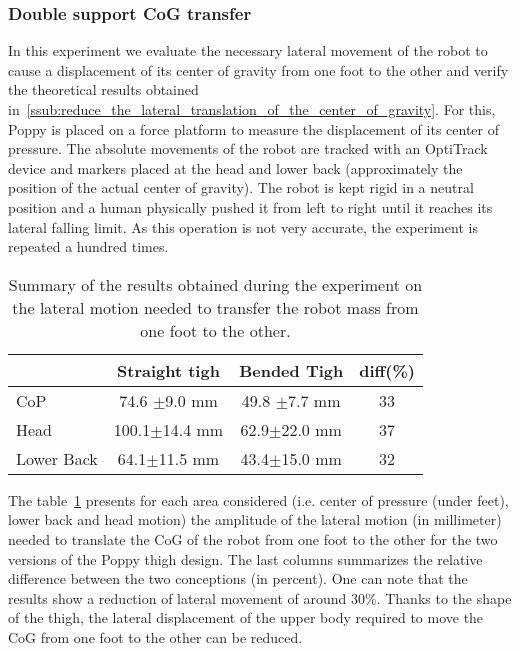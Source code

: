 

\subsubsection{Double support CoG transfer} %
\label{sub:cog_motion}


In this experiment we evaluate the necessary lateral movement of the robot to cause a displacement
of its center of gravity from one foot to the other and verify the theoretical results obtained
in~\ref{ssub:reduce_the_lateral_translation_of_the_center_of_gravity}. For this, Poppy is placed on
a force platform to measure the displacement of its center of pressure. The absolute movements of
the robot are tracked with an OptiTrack device and markers placed at the head and lower back
(approximately the position of the actual center of gravity). The robot is kept rigid in a neutral
position and a human physically pushed it from left to right until it reaches its lateral falling limit. As this operation is not very accurate, the experiment is repeated a hundred times.

\begin{table}[h]
\centering
\begin{tabular}{|l|c|c|c|}
  \hline &      Straight tigh &                     Bended Tigh &                   diff(\%) \\
  \hline CoP & 74.6 {\scriptsize$\pm$9.0} mm &     49.8 {\scriptsize$\pm$7.7} mm & 33\\
  Head & 100.1{\scriptsize$\pm$14.4} mm&     62.9{\scriptsize$\pm$22.0} mm &  37\\
  Lower Back & 64.1{\scriptsize$\pm$11.5} mm&      43.4{\scriptsize$\pm$15.0} mm &  32 \\
  \hline
\end{tabular}
\caption{Summary of the results obtained during the experiment on the lateral motion needed to transfer the robot mass from one foot to the other.}
\label{tab:CoG_motion}
\end{table}

The table~\ref{tab:CoG_motion} presents for each area considered (i.e. center of pressure (under feet), lower back and head motion) the amplitude of the lateral motion (in millimeter) needed to translate the CoG of the robot from one foot to the other for the two versions of the Poppy thigh design. The last columns summarizes the relative difference between the two conceptions (in percent). One can note that the results show a reduction of lateral movement of around 30\%. Thanks to the shape of the thigh, the lateral displacement of the upper body required to move the CoG from one foot to the other can be reduced.


